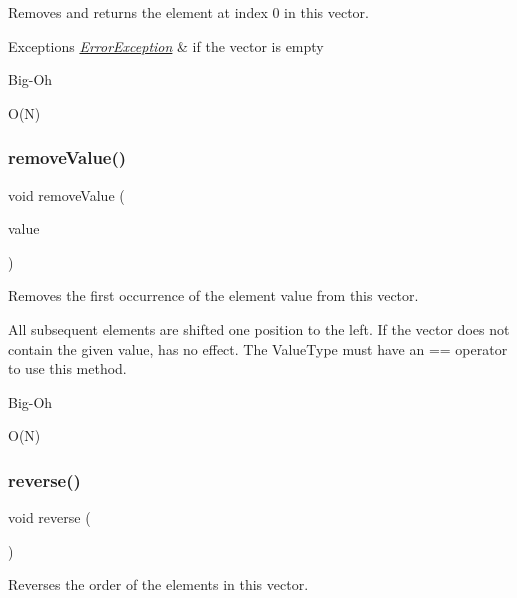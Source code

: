 Removes and returns the element at index 0 in this vector. 


\begin{DoxyExceptions}{Exceptions}
{\em \mbox{\hyperlink{classErrorException}{Error\+Exception}}} & if the vector is empty \\
\hline
\end{DoxyExceptions}
\begin{DoxyRefDesc}{Big-\/\+Oh}
\item[\mbox{\hyperlink{BigOh__BigOh000124}{Big-\/\+Oh}}]O(\+N) \end{DoxyRefDesc}
\mbox{\label{classVector_a10e8154a489093d2b1f20596342bcd78}} 
\subsubsection{\texorpdfstring{remove\+Value()}{removeValue()}}
{\footnotesize\ttfamily void remove\+Value (\begin{DoxyParamCaption}\item[{const Value\+Type \&}]{value }\end{DoxyParamCaption})}



Removes the first occurrence of the element value from this vector. 

All subsequent elements are shifted one position to the left. If the vector does not contain the given value, has no effect. The Value\+Type must have an == operator to use this method. \begin{DoxyRefDesc}{Big-\/\+Oh}
\item[\mbox{\hyperlink{BigOh__BigOh000126}{Big-\/\+Oh}}]O(\+N) \end{DoxyRefDesc}
\mbox{\label{classVector_a310c0bebc002158f5646a91d60e4dc89}} 
\subsubsection{\texorpdfstring{reverse()}{reverse()}}
{\footnotesize\ttfamily void reverse (\begin{DoxyParamCaption}{ }\end{DoxyParamCaption})}



Reverses the order of the elements in this vector. 

